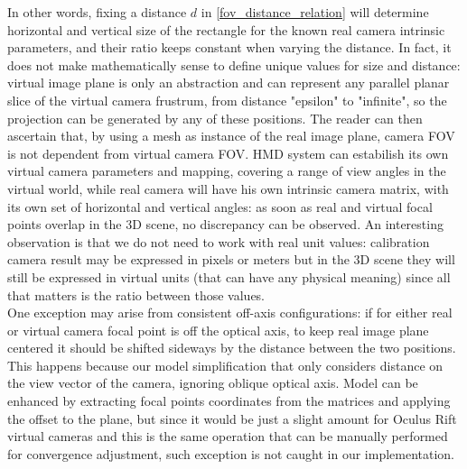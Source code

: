 In other words, fixing a distance $d$ in \ref{fov_distance_relation} will determine horizontal and vertical size of the rectangle for the known real camera intrinsic parameters, and their ratio keeps constant when varying the distance. In fact, it does not make mathematically sense to define unique values for size and distance: virtual image plane is only an abstraction and can represent any parallel planar slice of the virtual camera frustrum, from distance "epsilon" to "infinite", so the projection can be generated by any of these positions. The reader can then ascertain that, by using a mesh as instance of the real image plane, camera FOV is not dependent from virtual camera FOV. HMD system can estabilish its own virtual camera parameters and mapping, covering a range of view angles in the virtual world, while real camera will have his own intrinsic camera matrix, with its own set of horizontal and vertical angles: as soon as real and virtual focal points overlap in the 3D scene, no discrepancy can be observed. An interesting observation is that we do not need to work with real unit values: calibration camera result may be expressed in pixels or meters but in the 3D scene they will still be expressed in virtual units (that can have any physical meaning) since all that matters is the ratio between those values.\\
One exception may arise from consistent off-axis configurations: if for either real or virtual camera focal point is off the optical axis, to keep real image plane centered it should be shifted sideways by the distance between the two positions. This happens because our model simplification that only considers distance on the view vector of the camera, ignoring oblique optical axis. Model can be enhanced by extracting focal points coordinates from the matrices and applying the offset to the plane, but since it would be just a slight amount for Oculus Rift virtual cameras and this is the same operation that can be manually performed for convergence adjustment, such exception is not caught in our implementation.

